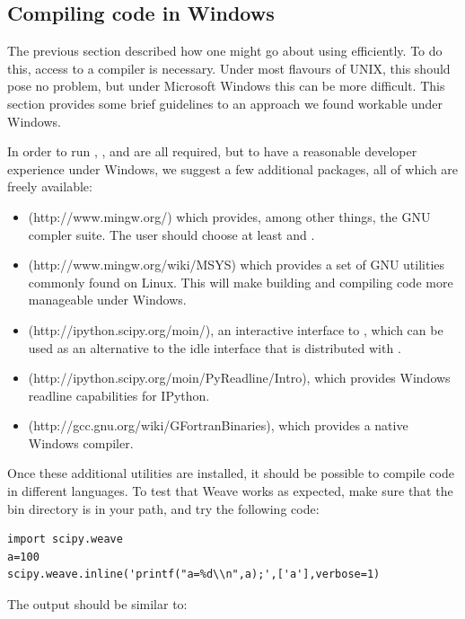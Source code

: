 \documentclass[article]{jss}
\begin{document}
\subsection{Compiling code in Windows}
\label{CompilingWindows}

The previous section described how one might go about using
 efficiently. To do this, access to a compiler is
necessary. Under most flavours of UNIX, this should pose no problem,
but under Microsoft Windows this can be more difficult. This section
provides some brief guidelines to an approach we found workable under
Windows.

In order to run , ,  and
 are all required, but to have a reasonable developer
experience under Windows, we suggest a few additional packages, all of
which are freely available:
\begin{itemize}
\item {} (http://www.mingw.org/) which provides, among other
  things, the GNU compler suite. The user should choose at least
   and .
\item {} (http://www.mingw.org/wiki/MSYS) which provides a set
  of GNU utilities commonly found on Linux. This will make building
  and compiling code more manageable under Windows.
\item {} (http://ipython.scipy.org/moin/), an interactive
  interface to , which can be used as an alternative
  to the idle interface that is distributed with .
\item {}
  (http://ipython.scipy.org/moin/PyReadline/Intro), which provides
  Windows readline capabilities for IPython.
\item {} (http://gcc.gnu.org/wiki/GFortranBinaries), which
  provides a native Windows  compiler.
\end{itemize}
Once these additional utilities are installed, it should be possible
to compile code in different languages. To test that Weave works as
expected, make sure that the  bin directory is in your
path, and try the following code:


\begin{lstlisting}[basicstyle={\scriptsize}]
import scipy.weave 
a=100 
scipy.weave.inline('printf("a=%d\\n",a);',['a'],verbose=1)
\end{lstlisting}


The output should be similar to:
\end{document}
